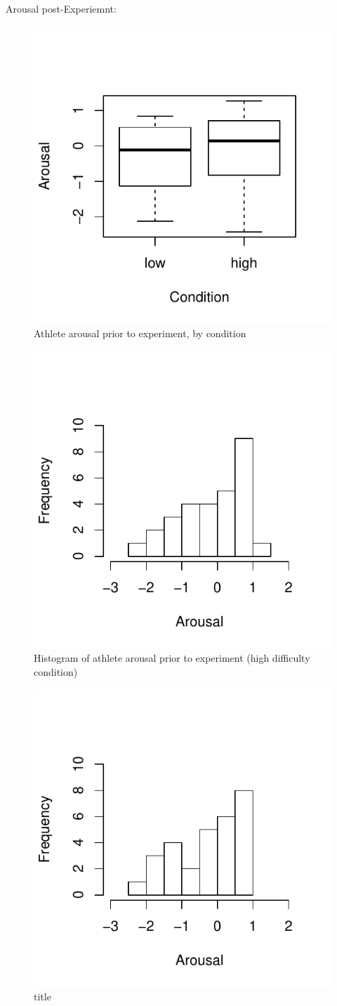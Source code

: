 Arousal post-Experiemnt:

\begin{figure}
  \centering
  \includegraphics[width=0.5\linewidth,keepaspectratio] {images/arousalFactorPreBoxPlot-1}
  \caption{Athlete arousal prior to experiment, by condition}
        \label{fig:arousalFactorPreBoxPlot}
    \end{figure}

\begin{figure}
  \centering
      \includegraphics[width=0.5\linewidth,keepaspectratio] {images/histArousalFactorPreHigh-1}
      \caption{Histogram of athlete arousal prior to experiment (high difficulty condition)}
        \label{fig:histArousalFactorPreHigh}
    \end{figure}

\begin{figure}
  \centering
  \includegraphics[width=0.5\linewidth,keepaspectratio] {images/histArousalFactorPreLow-1}
      \caption{Histogram of athlete arousal prior to experiment (low difficulty condition)}
  \caption{title}
    \label{fig:histArousalFactorPreLow}
\end{figure}
